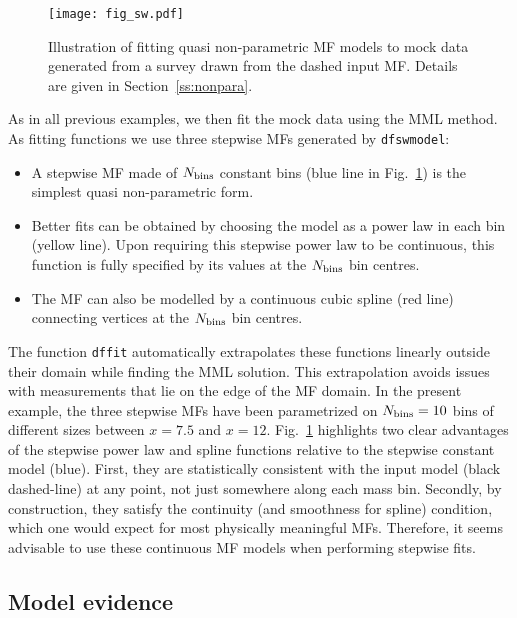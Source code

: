 \documentclass[a4paper,fleqn,usenatbib]{mnras}
\newcommand{\bi}{\begin{itemize}[leftmargin=3.5mm]\setlength{\itemindent}{-1.6mm}}
\newcommand{\ei}{\end{itemize}}
\newcommand{\fig}[1]{Fig.~\ref{fig:#1}}
\renewcommand{\ss}[1]{Section~\ref{ss:#1}}
\begin{document}
\begin{figure}
\begin{center}
\texttt{[image: fig\_sw.pdf]}\vspace{0.1cm}
\caption{Illustration of fitting quasi non-parametric MF models to mock data generated from a survey drawn from the dashed input MF. Details are given in \ss{nonpara}.}\label{fig:sw}
\end{center}
\end{figure}

As in all previous examples, we then fit the mock data using the MML method. As fitting functions we use three stepwise MFs generated by \texttt{dfswmodel}:
%
\bi
\item A stepwise MF made of $N_{\rm bins}$ constant bins (blue line in \fig{sw}) is the simplest quasi non-parametric form.
\item Better fits can be obtained by choosing the model as a power law in each bin (yellow line). Upon requiring this stepwise power law to be continuous, this function is fully specified by its values at the $N_{\rm bins}$ bin centres.
\item The MF can also be modelled by a continuous cubic spline (red line) connecting vertices at the $N_{\rm bins}$ bin centres.
\ei
%
The function \texttt{dffit} automatically extrapolates these functions linearly outside their domain while finding the MML solution. This extrapolation avoids issues with measurements that lie on the edge of the MF domain. In the present example, the three stepwise MFs have been parametrized on $N_{\rm bins}=10$ bins of different sizes between $x=7.5$ and $x=12$. \fig{sw} highlights two clear advantages of the stepwise power law and spline functions relative to the stepwise constant model (blue). First, they are statistically consistent with the input model (black dashed-line) at any point, not just somewhere along each mass bin. Secondly, by construction, they satisfy the continuity (and smoothness for spline) condition, which one would expect for most physically meaningful MFs. Therefore, it seems advisable to use these continuous MF models when performing stepwise fits.

\subsection{Model evidence}\label{ss:evidence}
\end{document}

